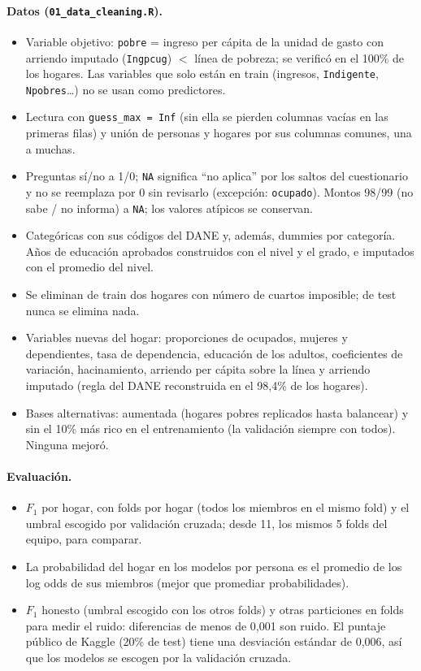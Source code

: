 \documentclass[12pt]{article}
\begin{document}
\paragraph{Datos (\texttt{01\_data\_cleaning.R}).}
\begin{itemize}
  \item Variable objetivo: \texttt{pobre} = ingreso per cápita de la unidad de
    gasto con arriendo imputado (\texttt{Ingpcug}) $<$ línea de pobreza; se
    verificó en el 100\% de los hogares. Las variables que solo están en
    train (ingresos, \texttt{Indigente}, \texttt{Npobres}\ldots) no se usan
    como predictores.
  \item Lectura con \texttt{guess\_max = Inf} (sin ella se pierden columnas
    vacías en las primeras filas) y unión de personas y hogares por sus
    columnas comunes, una a muchas.
  \item Preguntas sí/no a 1/0; \texttt{NA} significa ``no aplica'' por los
    saltos del cuestionario y no se reemplaza por 0 sin revisarlo
    (excepción: \texttt{ocupado}). Montos 98/99 (no sabe / no informa) a
    \texttt{NA}; los valores atípicos se conservan.
  \item Categóricas con sus códigos del DANE y, además, dummies por
    categoría. Años de educación aprobados construidos con el nivel y el
    grado, e imputados con el promedio del nivel.
  \item Se eliminan de train dos hogares con número de cuartos imposible;
    de test nunca se elimina nada.
  \item Variables nuevas del hogar: proporciones de ocupados, mujeres y
    dependientes, tasa de dependencia, educación de los adultos,
    coeficientes de variación, hacinamiento, arriendo per cápita sobre la
    línea y arriendo imputado (regla del DANE reconstruida en el 98,4\% de
    los hogares).
  \item Bases alternativas: aumentada (hogares pobres replicados hasta
    balancear) y sin el 10\% más rico en el entrenamiento (la validación
    siempre con todos). Ninguna mejoró.
\end{itemize}

\paragraph{Evaluación.}
\begin{itemize}
  \item $F_1$ por hogar, con folds por hogar (todos los miembros en el mismo
    fold) y el umbral escogido por validación cruzada; desde 11, los mismos
    5 folds del equipo, para comparar.
  \item La probabilidad del hogar en los modelos por persona es el promedio
    de los log odds de sus miembros (mejor que promediar probabilidades).
  \item $F_1$ honesto (umbral escogido con los otros folds) y otras
    particiones en folds para medir el ruido: diferencias de menos de 0,001
    son ruido. El puntaje público de Kaggle (20\% de test) tiene una
    desviación estándar de 0,006, así que los modelos se escogen por la
    validación cruzada.
\end{itemize}
\end{document}
